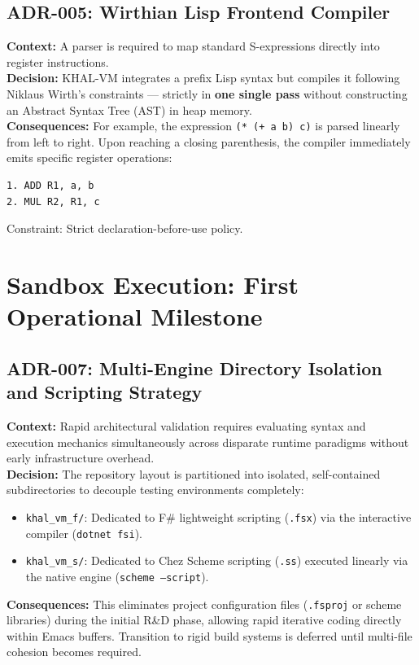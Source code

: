 \documentclass[12pt,a4paper]{article}
\begin{document}
\subsection{ADR-005: Wirthian Lisp Frontend Compiler}
\textbf{Context:} A parser is required to map standard S-expressions directly into register instructions. \\
\textbf{Decision:} KHAL-VM integrates a prefix Lisp syntax but compiles it following Niklaus Wirth's constraints --- strictly in \textbf{one single pass} without constructing an Abstract Syntax Tree (AST) in heap memory. \\
\textbf{Consequences:} For example, the expression \texttt{(* (+ a b) c)} is parsed linearly from left to right. Upon reaching a closing parenthesis, the compiler immediately emits specific register operations:
\begin{lstlisting}[basicstyle=\ttfamily]
1. ADD R1, a, b
2. MUL R2, R1, c
\end{lstlisting}
Constraint: Strict declaration-before-use policy.



\section{Sandbox Execution: First Operational Milestone}

\subsection{ADR-007: Multi-Engine Directory Isolation and Scripting Strategy}
\textbf{Context:} Rapid architectural validation requires evaluating syntax and execution mechanics simultaneously across disparate runtime paradigms without early infrastructure overhead. \\
\textbf{Decision:} The repository layout is partitioned into isolated, self-contained subdirectories to decouple testing environments completely:
\begin{itemize}
    \item \texttt{khal\_vm\_f/}: Dedicated to F\# lightweight scripting (\texttt{.fsx}) via the interactive compiler (\texttt{dotnet fsi}).
    \item \texttt{khal\_vm\_s/}: Dedicated to Chez Scheme scripting (\texttt{.ss}) executed linearly via the native engine (\texttt{scheme --script}).
\end{itemize}
\textbf{Consequences:} This eliminates project configuration files (\texttt{.fsproj} or scheme libraries) during the initial R\&D phase, allowing rapid iterative coding directly within Emacs buffers. Transition to rigid build systems is deferred until multi-file cohesion becomes required.
\end{document}

